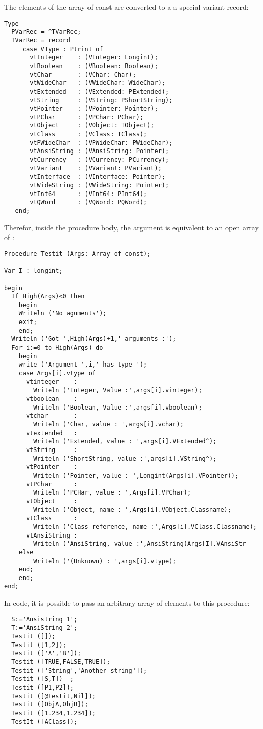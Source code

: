 The elements of the array of const are converted to a a special variant record:
\begin{verbatim}
Type
  PVarRec = ^TVarRec;
  TVarRec = record
     case VType : Ptrint of
       vtInteger    : (VInteger: Longint);
       vtBoolean    : (VBoolean: Boolean);
       vtChar       : (VChar: Char);
       vtWideChar   : (VWideChar: WideChar);
       vtExtended   : (VExtended: PExtended);
       vtString     : (VString: PShortString);
       vtPointer    : (VPointer: Pointer);
       vtPChar      : (VPChar: PChar);
       vtObject     : (VObject: TObject);
       vtClass      : (VClass: TClass);
       vtPWideChar  : (VPWideChar: PWideChar);
       vtAnsiString : (VAnsiString: Pointer);
       vtCurrency   : (VCurrency: PCurrency);
       vtVariant    : (VVariant: PVariant);
       vtInterface  : (VInterface: Pointer);
       vtWideString : (VWideString: Pointer);
       vtInt64      : (VInt64: PInt64);
       vtQWord      : (VQWord: PQWord);
   end;
\end{verbatim}
Therefor, inside the procedure body, the  argument is equivalent to
an open array of :
\begin{verbatim}
Procedure Testit (Args: Array of const);

Var I : longint;

begin
  If High(Args)<0 then
    begin
    Writeln ('No aguments');
    exit;
    end;
  Writeln ('Got ',High(Args)+1,' arguments :');
  For i:=0 to High(Args) do
    begin
    write ('Argument ',i,' has type ');
    case Args[i].vtype of
      vtinteger    :
        Writeln ('Integer, Value :',args[i].vinteger);
      vtboolean    :
        Writeln ('Boolean, Value :',args[i].vboolean);
      vtchar       :
        Writeln ('Char, value : ',args[i].vchar);
      vtextended   :
        Writeln ('Extended, value : ',args[i].VExtended^);
      vtString     :
        Writeln ('ShortString, value :',args[i].VString^);
      vtPointer    :
        Writeln ('Pointer, value : ',Longint(Args[i].VPointer));
      vtPChar      :
        Writeln ('PCHar, value : ',Args[i].VPChar);
      vtObject     :
        Writeln ('Object, name : ',Args[i].VObject.Classname);
      vtClass      :
        Writeln ('Class reference, name :',Args[i].VClass.Classname);
      vtAnsiString :
        Writeln ('AnsiString, value :',AnsiString(Args[I].VAnsiStr
    else
        Writeln ('(Unknown) : ',args[i].vtype);
    end;
    end;
end;
\end{verbatim}
In code, it is possible to pass an arbitrary array of elements
to this procedure:
\begin{verbatim}
  S:='Ansistring 1';
  T:='AnsiString 2';
  Testit ([]);
  Testit ([1,2]);
  Testit (['A','B']);
  Testit ([TRUE,FALSE,TRUE]);
  Testit (['String','Another string']);
  Testit ([S,T])  ;
  Testit ([P1,P2]);
  Testit ([@testit,Nil]);
  Testit ([ObjA,ObjB]);
  Testit ([1.234,1.234]);
  TestIt ([AClass]);
\end{verbatim}

